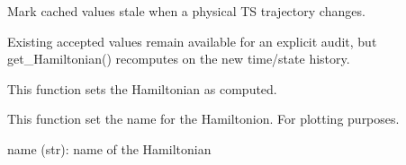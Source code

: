 \documentclass[letterpaper,10pt,english]{sphinxmanual}
\begin{document}
\begin{fulllineitems}
\begin{fulllineitems}
\begin{description}
\end{description}

\end{fulllineitems}


\begin{fulllineitems}
\label{\detokenize{scrimp:scrimp.hamiltonian.Hamiltonian.invalidate}}
\pysigstartsignatures
\pysiglinewithargsret
{}
{}
{}
\pysigstopsignatures
\sphinxAtStartPar
Mark cached values stale when a physical TS trajectory changes.

\sphinxAtStartPar
Existing accepted values remain available for an explicit audit,
but get\_Hamiltonian() recomputes on the new time/state history.

\end{fulllineitems}


\begin{fulllineitems}
\label{\detokenize{scrimp:scrimp.hamiltonian.Hamiltonian.set_is_computed}}
\pysigstartsignatures
\pysiglinewithargsret
{}
{}
{}
\pysigstopsignatures
\sphinxAtStartPar
This function sets the Hamiltonian as computed.

\end{fulllineitems}


\begin{fulllineitems}
\label{\detokenize{scrimp:scrimp.hamiltonian.Hamiltonian.set_name}}
\pysigstartsignatures
\pysiglinewithargsret
{}
{}
{}
\pysigstopsignatures
\sphinxAtStartPar
This function set the name for the Hamiltonion. For plotting purposes.
\begin{description}
\sphinxAtStartPar
name (str): name of the Hamiltonian

\end{description}

\end{fulllineitems}


\end{fulllineitems}
\end{document}
